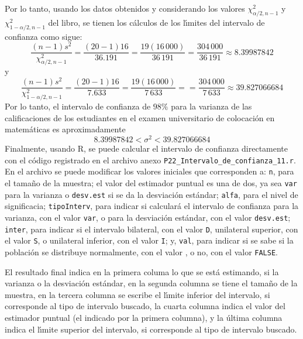 \begin{solucion}
 Por lo tanto, usando los datos obtenidos y considerando los valores $\chi^2_{\alpha/2,n-1}$ y $\chi^2_{1-\alpha/2,n-1}$ del libro, se tienen los c\'alculos de los l\'{\i}mites del intervalo de confianza como sigue:
 \begin{equation*}
  \frac{(n-1)s^2}{\chi^2_{\alpha/2,n-1}} = \frac{(20-1)16}{36.191} = \frac{19(16\,000)}{36\,191}= \frac{304\,000}{36\,191} \approx 8.39987842
 \end{equation*}
 y
 \begin{equation*}
  \frac{(n-1)s^2}{\chi^2_{1-\alpha/2,n-1}} = \frac{(20-1)16}{7.633} = \frac{19(16\,000)}{7\,633} = = \frac{304\,000}{7\,633} \approx 39.827066684
 \end{equation*}
 Por lo tanto, el intervalo de confianza de $98\%$ para la varianza de las calificaciones de los estudiantes en el examen universitario de colocaci\'on en matem\'aticas es aproximadamente
 \begin{equation*}
  8.39987842 < \sigma^2 < 39.827066684
 \end{equation*}
 Finalmente, usando R, se puede calcular el intervalo de confianza directamente con el c\'odigo registrado en el archivo anexo \texttt{P22\_Intervalo\_de\_confianza\_11.r}. En el archivo se puede modificar los valores iniciales que corresponden a: \texttt{n}, para el tama\~no de la muestra; el valor del estimador puntual es una de dos, ya sea \texttt{var} para la varianza o \texttt{desv.est} si se da la desviaci\'on est\'andar; \texttt{alfa}, para el nivel de significacia; \texttt{tipoInterv}, para indicar si calcular\'a el intervalo de confianza para la varianza, con el valor \texttt{var}, o para la desviaci\'on est\'andar, con el valor \texttt{desv.est}; \texttt{inter}, para indicar si el intervalo bilateral, con el valor \texttt{D}, unilateral superior, con el valor \texttt{S}, o unilateral inferior, con el valor \texttt{I}; y, \texttt{val}, para indicar si se sabe si la poblaci\'on se distribuye normalmente, con el valor , o no, con el valor \texttt{FALSE}.
 \par 
 El resultado final indica en la primera columa lo que se est\'a estimando, si la varianza o la desviaci\'on est\'andar, en la segunda columna se tiene el tama\~no de la muestra, en la tercera columna se escribe el l\'{\i}mite inferior del intervalo, si corresponde al tipo de intervalo buscado, la cuarta columna indica el valor del estimador puntual (el indicado por la primera columna), y la \'ultima columna indica el l\'{\i}mite superior del intervalo, si corresponde al tipo de intervalo buscado.

\end{solucion}
